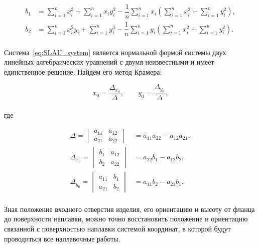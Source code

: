 \begin{align*}
    b_1 &= \sum_{i=1}^{n} x_i^3 + \sum_{i=1}^{n} x_i y_i^2
    - \dfrac{1}{n} \sum_{i=1}^{n} x_i \left(
    \sum_{i=1}^{n} x_i^2 + \sum_{i=1}^{n} y_i^2 \right), \\
    b_2 &= \sum_{i=1}^{n} x_i^2 y_i + \sum_{i=1}^{n} y_i^3
    - \dfrac{1}{n} \sum_{i=1}^{n} y_i \left(
    \sum_{i=1}^{n} x_i^2 + \sum_{i=1}^{n} y_i^2 \right).
\end{align*} \\

Система~\ref{eq:SLAU_system} является нормальной формой системы двух линейных алгебраических уравнений с двумя неизвестными и имеет единственное решение.
Найдём его метод Крамера:

\begin{equation*}
    x_0 = \dfrac{\Delta_{x_0}}{\Delta}, \qquad
    y_0 = \dfrac{\Delta_{y_0}}{\Delta},
\end{equation*} \\
где

\begin{align*}
    \Delta = \begin{vmatrix}
                 a_{11} & a_{12} \\
                 a_{21} & a_{22}
    \end{vmatrix} &= a_{11} a_{22} - a_{12} a_{21}, \\
    \Delta_{x_0} = \begin{vmatrix}
                       b_1 & a_{12} \\
                       b_2 & a_{22}
    \end{vmatrix} &= a_{22} b_1 - a_{12} b_2, \\
    \Delta_{y_0} = \begin{vmatrix}
                       a_{11} & b_1 \\
                       a_{21} & b_2
    \end{vmatrix} &= a_{11} b_2 - a_{21} b_1.
\end{align*} \\

Зная положение входного отверстия изделия, его ориентацию и высоту от фланца до поверхности наплавки, можно точно восстановить положение и ориентацию связанной с поверхностью наплавки системой координат, в которой будут проводиться все наплавочные работы.

